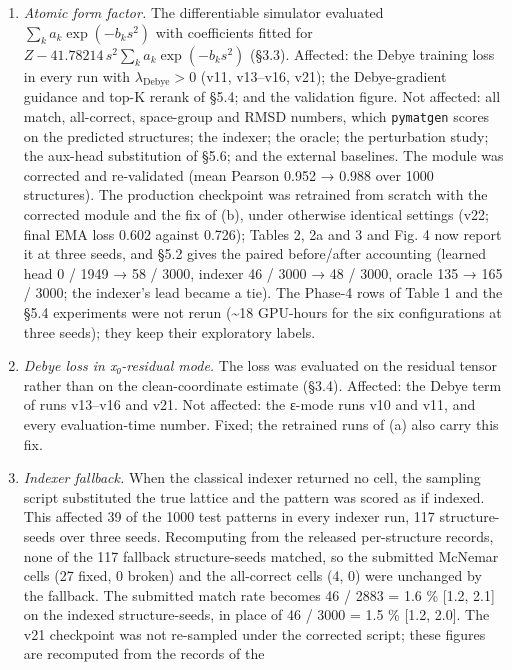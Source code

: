 \documentclass[
  11pt,
]{article}
\newcounter{none} %
\begin{document}
\begin{enumerate}
\def\labelenumi{(\alph{enumi})}
\item
  \emph{Atomic form factor.} The differentiable simulator evaluated
  \(\sum_k a_k \exp(-b_k s^2)\) with coefficients fitted for
  \(Z - 41.78214\,s^2 \sum_k a_k \exp(-b_k s^2)\) (§3.3). Affected: the
  Debye training loss in every run with \(\lambda_\text{Debye} > 0\)
  (v11, v13--v16, v21); the Debye-gradient guidance and top-K rerank of
  §5.4; and the validation figure. Not affected: all match, all-correct,
  space-group and RMSD numbers, which \texttt{pymatgen} scores on the
  predicted structures; the indexer; the oracle; the perturbation study;
  the aux-head substitution of §5.6; and the external baselines. The
  module was corrected and re-validated (mean Pearson 0.952 → 0.988 over
  1000 structures). The production checkpoint was retrained from scratch
  with the corrected module and the fix of (b), under otherwise
  identical settings (v22; final EMA loss 0.602 against 0.726); Tables
  2, 2a and 3 and Fig. 4 now report it at three seeds, and §5.2 gives
  the paired before/after accounting (learned head 0 / 1949 → 58 / 3000,
  indexer 46 / 3000 → 48 / 3000, oracle 135 → 165 / 3000; the indexer's
  lead became a tie). The Phase-4 rows of Table 1 and the §5.4
  experiments were not rerun (\textasciitilde18 GPU-hours for the six
  configurations at three seeds); they keep their exploratory labels.
\item
  \emph{Debye loss in x₀-residual mode.} The loss was evaluated on the
  residual tensor rather than on the clean-coordinate estimate (§3.4).
  Affected: the Debye term of runs v13--v16 and v21. Not affected: the
  ε-mode runs v10 and v11, and every evaluation-time number. Fixed; the
  retrained runs of (a) also carry this fix.
\item
  \emph{Indexer fallback.} When the classical indexer returned no cell,
  the sampling script substituted the true lattice and the pattern was
  scored as if indexed. This affected 39 of the 1000 test patterns in
  every indexer run, 117 structure-seeds over three seeds. Recomputing
  from the released per-structure records, none of the 117 fallback
  structure-seeds matched, so the submitted McNemar cells (27 fixed, 0
  broken) and the all-correct cells (4, 0) were unchanged by the
  fallback. The submitted match rate becomes 46 / 2883 = 1.6 \% {[}1.2,
  2.1{]} on the indexed structure-seeds, in place of 46 / 3000 = 1.5 \%
  {[}1.2, 2.0{]}. The v21 checkpoint was not re-sampled under the
  corrected script; these figures are recomputed from the records of the

\end{enumerate}
\end{document}

